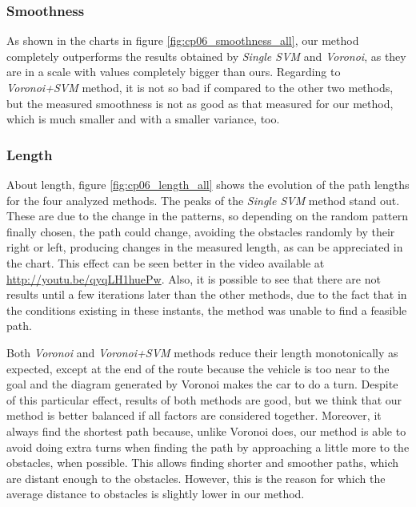 \subsubsection{Smoothness}\label{ch:chapter06_02_02_02}

As shown in the charts in figure \ref{fig:cp06_smoothness_all}, our method completely outperforms the results obtained by \textit{Single \ac{SVM}} and \textit{Voronoi}, as they are in a scale with values completely bigger than ours. Regarding to \textit{Voronoi+\ac{SVM}} method, it is not so bad if compared to the other two methods, but the measured smoothness is not as good as that measured for our method, which is much smaller and with a smaller variance, too.

\subsubsection{Length}\label{ch:chapter06_02_02_03}

About length, figure \ref{fig:cp06_length_all} shows the evolution of the path lengths for the four analyzed methods. The peaks of the \textit{Single \ac{SVM}} method stand out. These are due to the change in the patterns, so depending on the random pattern finally chosen, the path could change, avoiding the obstacles randomly by their right or left, producing changes in the measured length, as can be appreciated in the chart. This effect can be seen better in the video available at \url{http://youtu.be/qyqLH1huePw}. Also, it is possible to see that there are not results until a few iterations later than the other methods, due to the fact that in the conditions existing in these instants, the method was unable to find a feasible path.

Both \textit{Voronoi} and \textit{Voronoi+\ac{SVM}} methods reduce their length monotonically as expected, except at the end of the route because the vehicle is too near to the goal and the diagram generated by Voronoi makes the car to do a turn. Despite of this particular effect, results of both methods are good, but we think that our method is better balanced if all factors are considered together. Moreover, it always find the shortest path because, unlike Voronoi does, our method is able to avoid doing extra turns when finding the path by approaching a little more to the obstacles, when possible. This allows finding shorter and smoother paths, which are distant enough to the obstacles. However, this is the reason for which the average distance to obstacles is slightly lower in our method.

